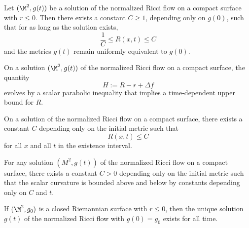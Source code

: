 \begin{proposition}
\label{ch05-prop-curvature-bounds-nonpositive-average}
Let \((\M^2,g(t))\) be a solution of the normalized Ricci flow on a compact surface with \(r\le 0\). Then there exists a constant \(C\ge 1\), depending only on \(g(0)\), such that for as long as the solution exists,
\[
\frac1C \le R(x,t)\le C
\]
and the metrics \(g(t)\) remain uniformly equivalent to \(g(0)\).
\end{proposition}

\begin{proposition}[Evolution of \(H\)]
\label{ch05-prop-H-evolution}
On a solution \((\M^2,g(t))\) of the normalized Ricci flow on a compact surface, the quantity
\[
H:=R-r+\Delta f
\]
evolves by a scalar parabolic inequality that implies a time-dependent upper bound for \(R\).
\end{proposition}

\begin{corollary}
\label{ch05-cor-upper-curvature-control}
On a solution of the normalized Ricci flow on a compact surface, there exists a constant \(C\) depending only on the initial metric such that
\[
R(x,t)\le C
\]
for all \(x\) and all \(t\) in the existence interval.
\end{corollary}

\begin{proposition}
\label{ch05-prop-two-sided-curvature-control}
For any solution \((M^2,g(t))\) of the normalized Ricci flow on a compact surface, there exists a constant \(C>0\) depending only on the initial metric such that the scalar curvature is bounded above and below by constants depending only on \(C\) and \(t\).
\end{proposition}

\begin{proposition}
\label{ch05-prop-long-time-existence-nonpositive}
If \((\M^2,g_0)\) is a closed Riemannian surface with \(r\le 0\), then the unique solution \(g(t)\) of the normalized Ricci flow with \(g(0)=g_0\) exists for all time.
\end{proposition}


